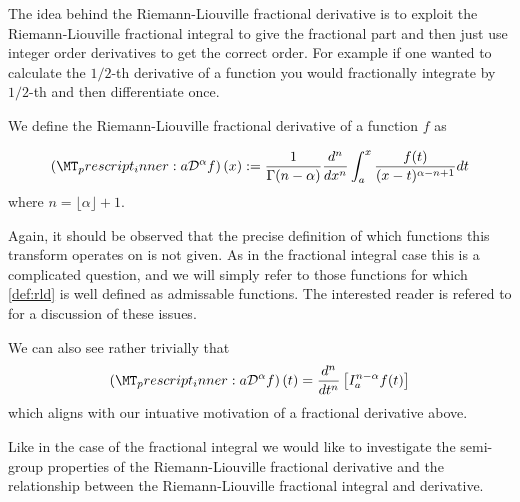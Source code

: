 The idea behind the Riemann-Liouville fractional derivative is to exploit the Riemann-Liouville fractional integral to give the fractional part and then just use integer order derivatives to get the correct order. For example if one wanted to calculate the $ 1/2$-th derivative of a function you would fractionally integrate by $1/2$-th and then differentiate once.
\begin{definition}
We define the Riemann-Liouville fractional derivative of a function $ f $ as

\begin{align}
    \label{def:rld}
    \rld{a}{}{\alpha}{f}(x) := \frac{1}{\Gamma(n-\alpha)} \frac{d^n}{dx^n} \int_{a}^{x} \frac{f(t)}{(x-t)^{\alpha - n + 1}} dt
\end{align}
where $ n = \lfloor \alpha \rfloor + 1 $.
\end{definition}
Again, it should be observed that the precise definition of which functions this transform operates on is not given. As in the fractional integral case this is a complicated question, and we will simply refer to those functions for which \eqref{def:rld} is well defined as admissable functions. The interested reader is refered to \cite{Samko1993} for a discussion of these issues.

We can also see rather trivially that
\begin{align}
    \left(\prescript{}{a}{\mathcal{D}}^\alpha{f}\right)(t) = \frac{d^n}{dt^n}\left[ I_a^{n-\alpha}f(t) \right]
\end{align}
which aligns with our intuative motivation of a fractional derivative above.

Like in the case of the fractional integral we would like to investigate the semi-group properties of the Riemann-Liouville fractional derivative and the relationship between the Riemann-Liouville fractional integral and derivative.

